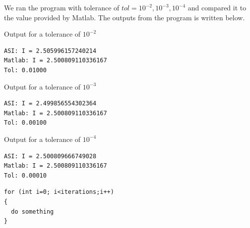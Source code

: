 \documentclass[a4paper,10pt]{article}
\begin{document}
We ran the program with tolerance of $tol=10^{-2}, 10^{-3}, 10^{-4}$ and compared it to the value provided by Matlab. The outputs from the program is written below.
\newline

Output for a tolerance of $10^{-2}$
\begin{center}
\begin{lstlisting}
ASI: I = 2.505996157240214
Matlab: I = 2.500809110336167
Tol: 0.01000
\end{lstlisting}
\end{center}

Output for a tolerance of $10^{-3}$
\begin{center}
\begin{lstlisting}
ASI: I = 2.499856554302364
Matlab: I = 2.500809110336167
Tol: 0.00100
\end{lstlisting}
\end{center}

Output for a tolerance of $10^{-4}$
\begin{center}
\begin{lstlisting}
ASI: I = 2.500809666749028
Matlab: I = 2.500809110336167
Tol: 0.00010
\end{lstlisting}
\end{center}

\newpage
\begin{center}
\begin{minipage}[t]{85mm}
\begin{lstlisting}
for (int i=0; i<iterations;i++)
{
  do something
}
\end{lstlisting}
\end{minipage}
\end{center}

%
\end{document}
